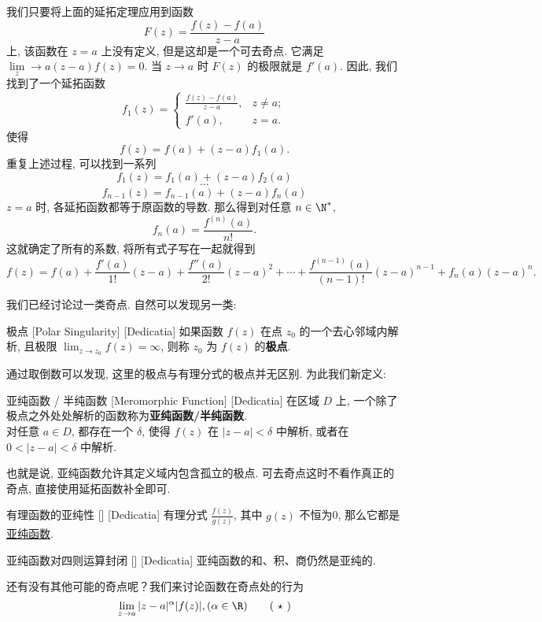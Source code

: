 \documentclass[UTF8]{ctexart}
\newcommand{\MeromorphicFunction}{\hyperref[dfn:MeromorphicFunction]{亚纯函数}}
\begin{document}
\begin{prf}
    我们只要将上面的延拓定理应用到函数
    \[F(z)=\frac{f(z)-f(a)}{z-a}\]
    上, 该函数在 \( z=a \) 上没有定义, 但是这却是一个可去奇点. 它满足 \( \lim\limits_z\to a(z-a)f(z)=0 \). 当 \( z\to a \) 时 \( F(z) \) 的极限就是 \( f'(a) \). 因此, 我们找到了一个延拓函数
    \[f_1(z)=\begin{cases}
        \frac{f(z)-f(a)}{z-a}, & z\neq a;\\
        f'(a), &z=a.
    \end{cases}\]
    使得
    \[f(z)=f(a)+(z-a)f_1(a).\]
    重复上述过程, 可以找到一系列
    \[f_1(z)=f_1(a)+(z-a)f_2(a)\]
    \[\cdots\]
    \[f_{n-1}(z)=f_{n-1}(a)+(z-a)f_n(a)\]
     \( z=a \) 时, 各延拓函数都等于原函数的导数. 那么得到对任意 \( n\in\N^* \),
    \[f_n(a)=\frac{f^{(n)}(a)}{n!}.\]
    这就确定了所有的系数, 将所有式子写在一起就得到
    \[f(z)=f(a)+\frac{f'(a)}{1!}(z-a)+\frac{f''(a)}{2!}(z-a)^2+\cdots+\frac{f^{(n-1)}(a)}{(n-1)!}(z-a)^{n-1}+f_n(a)(z-a)^n.\]
\end{prf}
我们已经讨论过一类奇点. 自然可以发现另一类: 
\begin{dfn}
    [PolarSingularity]
    {极点}
    [Polar Singularity]
    [Dedicatia]
    如果函数 \( f(z) \) 在点 \( z_0 \) 的一个去心邻域内解析, 且极限 \( \lim_{z \to z_0} f(z) = \infty \), 则称 \( z_0 \) 为 \( f(z) \) 的\textbf{极点}. 
\end{dfn}
通过取倒数可以发现, 这里的极点与有理分式的极点并无区别. 为此我们新定义: 
\begin{dfn}
    [MeromorphicFunction]
    {亚纯函数 / 半纯函数}
    [Meromorphic Function]
    [Dedicatia]
    在区域 \( D \) 上, 一个除了极点之外处处解析的函数称为\textbf{亚纯函数/半纯函数}.\\
    对任意 \( a\in D \), 都存在一个 \( \delta \), 使得 \( f(z) \) 在 \( |z-a|<\delta \) 中解析, 或者在 \( 0<|z-a|<\delta \) 中解析. 
\end{dfn}
也就是说, 亚纯函数允许其定义域内包含孤立的极点. 可去奇点这时不看作真正的奇点, 直接使用延拓函数补全即可. 
\begin{crl}
    [UUID]
    {有理函数的亚纯性}
    []
    [Dedicatia]
    有理分式 \( \frac{f(z)}{g(z)} \), 其中 \( g(z) \) 不恒为0, 那么它都是\MeromorphicFunction.
\end{crl}
\begin{ppt}
    [UUID]
    {亚纯函数对四则运算封闭}
    []
    [Dedicatia]
    亚纯函数的和、积、商仍然是亚纯的. 
\end{ppt}
还有没有其他可能的奇点呢？我们来讨论函数在奇点处的行为
\[\lim_{z\to a}|z-a|^\alpha |f(z)|, (\alpha\in\R)\tag{ \( \star \) }\]
\end{document}
